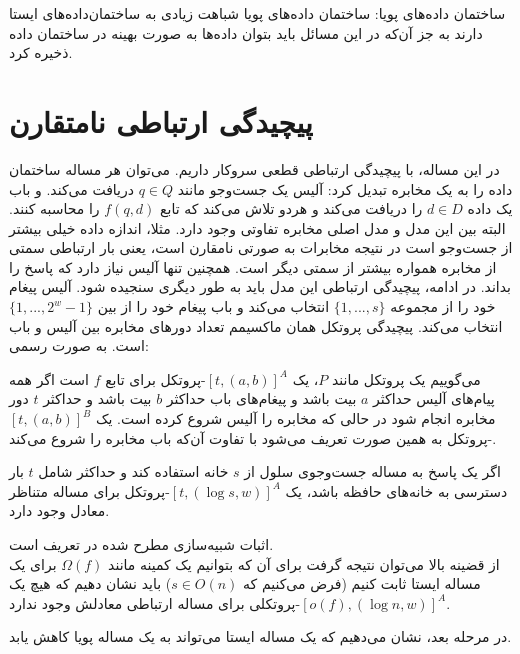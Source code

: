 \begin{definition}
ساختمان داده‌های پویا:
ساختمان داده‌های پویا شباهت زیادی به ساختمان‌داده‌های ایستا دارند به جز آن‌که در این مسائل باید بتوان داده‌ها به صورت بهینه در ساختمان‌ داده ذخیره کرد.
\end{definition}


\section{پیچیدگی ارتباطی نامتقارن}

در این مساله، با پیچیدگی ارتباطی قطعی سروکار داریم. می‌توان هر مساله ساختمان داده را به یک مخابره تبدیل کرد: آلیس یک جست‌وجو مانند $q \in Q$ دریافت می‌کند. و باب یک داده $d \in D$ را دریافت می‌کند و هردو تلاش می‌کند که تابع $f(q,d)$ را محاسبه کنند.\cite{Nisan98} البته بین این مدل و مدل اصلی مخابره تفاوتی وجود دارد. مثلا، اندازه داده خیلی بیشتر از جست‌وجو است در نتیجه مخابرات به صورتی نامقارن است، یعنی بار ارتباطی سمتی از مخابره همواره بیشتر از سمتی دیگر است.  همچنین تنها آلیس نیاز دارد که پاسخ را بداند. در ادامه، پیچیدگی ارتباطی این مدل باید به طور دیگری سنجیده شود. آلیس پیغام خود را از مجموعه $\{1,...,s\}$ انتخاب می‌کند و باب پیغام خود را از بین $\{1,...,2^{w}-1\}$ انتخاب می‌کند. پیچیدگی پروتکل همان ماکسیمم تعداد دورهای مخابره بین آلیس و باب است. به صورت رسمی:

\begin{definition}
می‌گوییم یک پروتکل مانند $P$، یک $[t,(a,b)]^{A}$-پروتکل برای تابع $f$ است اگر همه پیام‌های آلیس حداکثر $a$  بیت باشد و پیغام‌های باب حداکثر $b$ بیت باشد و حداکثر $t$ دور مخابره انجام شود در حالی که مخابره را آلیس شروع کرده است. یک $[t,(a,b)]^{B}$-پروتکل به همین صورت تعریف می‌شود با تفاوت آن‌که باب مخابره را شروع می‌کند.  
\end{definition}

\begin{theorem}
اگر یک پاسخ به مساله جست‌وجوی سلول از $s$ خانه استفاده کند و حداکثر شامل $t$ بار دسترسی به خانه‌های حافظه باشد، یک $[t,(\log s,w)]^{A}$-پروتکل برای مساله متناظر معادل وجود دارد. 
\end{theorem}

اثبات شبیه‌سازی مطرح شده در تعریف است. \\

از قضینه بالا می‌توان نتیجه گرفت برای آن که بتوانیم یک کمینه مانند $\Omega(f)$ برای یک مساله ایستا ثابت کنیم (فرض می‌کنیم که $s \in O(n)$) باید نشان دهیم که هیچ یک $[o(f),(\log n,w)]^{A}$-پروتکلی برای مساله ارتباطی معادلش وجود ندارد. 
 

در مرحله بعد، نشان می‌دهیم که یک مساله ایستا می‌تواند به یک مساله پویا کاهش یابد.


